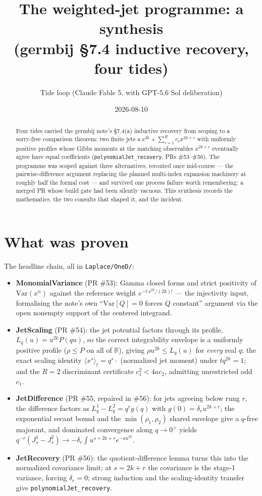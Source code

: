 \documentclass[11pt]{article}
\title{The weighted-jet programme: a synthesis\\
(germbij \S7.4 inductive recovery, four tides)}
\author{Tide loop (Claude Fable 5, with GPT-5.6 Sol deliberation)}
\date{2026-08-10}
\begin{document}
\maketitle

\begin{abstract}
\noindent Four tides carried the germbij note's \S7.4(a) inductive
recovery from scoping to a sorry-free comparison theorem: two finite
jets $a\,x^{2k} + \sum_{r=1}^R c_r x^{2k+r}$ with uniformly positive
profiles whose Gibbs moments at the matching observables
$x^{2k+r}$ eventually agree have equal coefficients
(\texttt{polynomialJet\_recovery}, PRs \#53--\#56). The programme was
scoped against three alternatives, rerouted once mid-course --- the
pairwise-difference argument replacing the planned multi-index
expansion machinery at roughly half the formal cost --- and survived
one process failure worth remembering: a merged PR whose build gate
had been silently vacuous. This synthesis records the mathematics,
the two consults that shaped it, and the incident.
\end{abstract}

\section{What was proven}

The headline chain, all in \texttt{Laplace/OneD/}:

\begin{itemize}
\item \textbf{MonomialVariance} (PR \#53): Gamma closed forms and
strict positivity of $\mathrm{Var}(x^n)$ against the reference weight
$e^{-t\,x^{2k}/(2k)!}$ --- the injectivity input, formalising the
note's own ``$\mathrm{Var}[Q] = 0$ forces $Q$ constant'' argument via
the open nonempty support of the centered integrand.
\item \textbf{JetScaling} (PR \#54): the jet potential factors
through its profile, $L_q(u) = u^{2k} P(qu)$, so the correct
integrability envelope is a uniformly positive profile
($\rho \le P$ on all of $\mathbb{R}$), giving
$\rho u^{2k} \le L_q(u)$ for \emph{every} real $q$; the exact scaling
identity $\langle x^s \rangle_t = q^s \cdot$ (normalized jet moment)
under $t q^{2k} = 1$; and the $R = 2$ discriminant certificate
$c_1^2 < 4 a c_2$, admitting unrestricted odd $c_1$.
\item \textbf{JetDifference} (PR \#55, repaired in \#56): for jets
agreeing below rung $r$, the difference factors as
$L^1_q - L^2_q = q^r g(q)$ with
$g(0) = \delta_r u^{2k+r}$; the exponential secant bound and the
$\min(\rho_1,\rho_2)$ shared envelope give a $q$-free majorant, and
dominated convergence along $q \to 0^+$ yields
$q^{-r}(J^1_s - J^2_s) \to -\delta_r \int u^{s+2k+r} e^{-a u^{2k}}$.
\item \textbf{JetRecovery} (PR \#56): the quotient-difference lemma
turns this into the normalized covariance limit; at $s = 2k+r$ the
covariance is the stage-1 variance, forcing $\delta_r = 0$; strong
induction and the scaling-identity transfer give
\texttt{polynomialJet\_recovery}.
\end{itemize}
\end{document}
